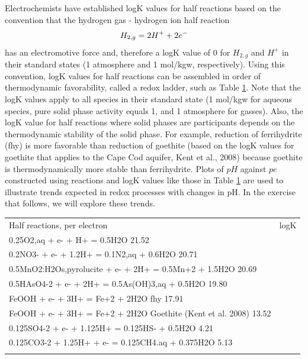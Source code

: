Electrochemists have established logK values for 
half reactions based on the 
convention that the hydrogen gas -
hydrogen ion half reaction
\begin{equation}
H_{2,g}  =  2H^+ + 2e^- \\   
\label{eq:rdx9}
\end{equation} 
has an electromotive force and, therefore a logK 
value of 0 for $H_{2,g}$ and $H^+$ in their 
standard states (1 atmosphere and 1 mol/kgw, respectively).  
Using this convention, logK values for half reactions can be assembled 
in order of thermodynamic favorability, 
called a redox ladder, such as Table \ref{tab:rdx1}.  
Note that the logK values apply to all species in their standard state 
(1 mol/kgw for aqueous species, pure solid phase activity 
equals 1, and 1 atmosphere for gasses).  
Also, the logK value for half reactions where solid phases are participants 
depends on the thermodynamic stability of the solid phase.  
For example, reduction of ferrihydrite (fhy) is more favorable than 
reduction of goethite (based on the logK values for goethite that 
applies to the Cape Cod aquifer, Kent et al., 2008) because goethite 
is thermodynamically more stable than ferrihydrite.  
Plots of $pH$ against $pe$ constructed using reactions and logK values like 
those in Table \ref{tab:rdx1} are used to illustrate 
trends expected in redox processes 
with changes in pH. In the exercise that follows, we will explore these trends.

\begin{table}[h]
\centering
\footnotesize
\begin{tabular}{ll}
\toprule
Half reactions, per electron	& logK \\
0.25O2,aq + e- + H+ = 0.5H2O	21.52 \\
0.2NO3- + e- + 1.2H+ = 0.1N2,aq + 0.6H2O	20.71 \\
0.5MnO2:H2Os,pyrolucite + e- + 2H+ = 0.5Mn+2 + 1.5H2O	20.69 \\
0.5HAsO4-2 + e- + 2H+   =  0.5As(OH)3,aq +  0.5H2O	19.80 \\
FeOOH + e- + 3H+ = Fe+2 + 2H2O  fhy	17.91 \\
FeOOH + e- + 3H+ = Fe+2 + 2H2O  Goethite (Kent et al. 2008)	13.52 \\
0.125SO4-2 + e- + 1.125H+ = 0.125HS- + 0.5H2O	4.21 \\
0.125CO3-2 + 1.25H+ + e- = 0.125CH4.aq + 0.375H2O	5.13 \\
\bottomrule
\label{tab:rdx1}
\end{tabular}
\end{table}	

